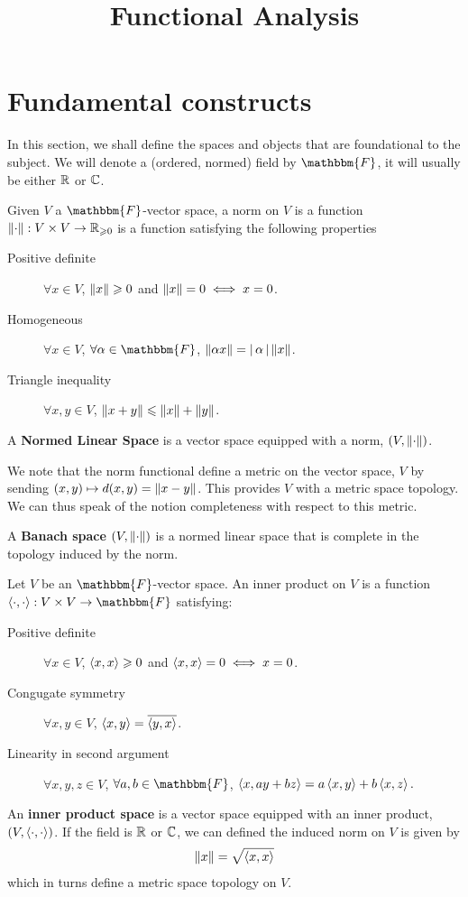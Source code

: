 \documentclass[12pt]{article}
\title{Functional Analysis}
\date{}
\begin{document}
\maketitle 
\section{Fundamental constructs} 
In this section, we shall define the spaces and objects that are foundational to the subject. We will denote a (ordered, normed) field by $\mathbbm{F}$, it will usually be either $\R$ or $\C$. 

\begin{fdefinition} Given $V$ a $\mathbbm{F}$-vector space, a norm on $V$ is a function $\norm : V \times V \to \R_{\geq 0}$ is a function satisfying the following properties
\begin{description}
\item[Positive definite] $\forall x \in V$, $\norm[x] \geq 0 $ and $ \norm[x] = 0 \iff x = 0$. 
\item[Homogeneous] $\forall x \in V$, $\forall \alpha \in \mathbbm{F}$, $\norm[\alpha x] = \abs{\alpha} \norm[x]$. 
\item[Triangle inequality] $\forall x, y \in V$, $\norm[x + y] \leq \norm[x] + \norm[y]$. 
\end{description}
A \textbf{Normed Linear Space} is a vector space equipped with a norm,  $(V, \norm)$. 
\end{fdefinition}
We note that the norm functional define a metric on the vector space, $V$ by sending $(x, y) \mapsto d(x, y) = \norm[x-y]$. This provides $V$ with a metric space topology. We can thus speak of the notion completeness with respect to this metric. 

\begin{fdefinition} A \textbf{Banach space} $(V, \norm)$ is a normed linear space that is complete in the topology induced by the norm. 
\end{fdefinition}

\begin{fdefinition} Let $V$ be an $\mathbbm{F}$-vector space. An inner product on $V$ is a function $\inprod : V \times V \to \mathbbm{F}$ satisfying: 
\begin{description}
\item[Positive definite] $\forall x \in V$, $\inprod[x, x] \geq 0$ and $\inprod[x, x] = 0 \iff x = 0$. 
\item[Congugate symmetry] $\forall x, y \in V$, $\inprod[x, y] = \overline{\inprod[y, x]}$. 
\item[Linearity in second argument] $\forall x, y, z \in V$, $\forall a, b \in \mathbbm{F}$, $\inprod[x, ay + bz] = a \inprod[x, y] + b \inprod[x, z]. $
\end{description}
An \textbf{inner product space} is a vector space equipped with an inner product, $(V, \inprod)$. If the field is $\R$ or $\C$, we can defined the induced norm on $V$ is given by 
\begin{align*}
\norm[x] = \sqrt{\inprod[x, x]}
\end{align*}
which in turns define a metric space topology on $V$. 
\end{fdefinition}
\end{document}
